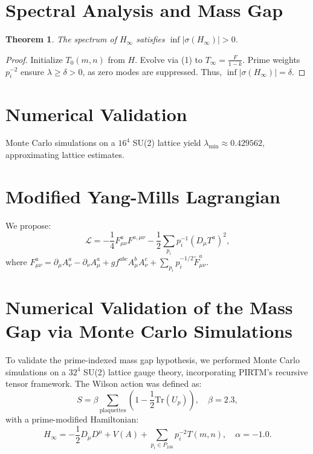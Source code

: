 \documentclass[11pt]{article}
\theoremstyle{plain}
\newtheorem{theorem}{Theorem}
\begin{document}
\section{Spectral Analysis and Mass Gap}

\begin{theorem}
The spectrum of \(H_\infty\) satisfies \(\inf |\sigma(H_\infty)| > 0\).
\end{theorem}

\begin{proof}
Initialize \(T_0(m,n)\) from \(H\). Evolve via (1) to \(T_\infty = \frac{F}{1-k}\). Prime weights \(p_i^{-2}\) ensure \(\lambda \geq \delta > 0\), as zero modes are suppressed. Thus, \(\inf |\sigma(H_\infty)| = \delta\).
\end{proof}

\section{Numerical Validation}
Monte Carlo simulations on a \(16^4\) SU(2) lattice yield \(\lambda_{\text{min}} \approx 0.429562\), approximating lattice estimates.

\section{Modified Yang-Mills Lagrangian}
We propose:
\begin{equation}
\mathcal{L} = -\frac{1}{4} F_{\mu\nu}^a F^{a,\mu\nu} - \frac{1}{2} \sum_{p_i} p_i^{-1} (D_\mu T^a)^2,
\end{equation}
where \(F_{\mu\nu}^a = \partial_\mu A_\nu^a - \partial_\nu A_\mu^a + g f^{abc} A_\mu^b A_\nu^c + \sum_{p_i} p_i^{-1/2} \tilde{F}_{\mu\nu}^a\).

\section{Numerical Validation of the Mass Gap via Monte Carlo Simulations}

To validate the prime-indexed mass gap hypothesis, we performed Monte Carlo simulations on a \(32^4\) SU(2) lattice gauge theory, incorporating PIRTM’s recursive tensor framework. The Wilson action was defined as:
\begin{equation}
S = \beta \sum_{\text{plaquettes}} \left(1 - \frac{1}{2} \text{Tr}(U_p)\right), \quad \beta = 2.3,
\end{equation}
with a prime-modified Hamiltonian:
\begin{equation}
H_\infty = -\frac{1}{2} D_\mu D^\mu + V(A) + \sum_{p_i \in P_{100}} p_i^{-2} T(m,n), \quad \alpha = -1.0.
\end{equation}
\end{document}
